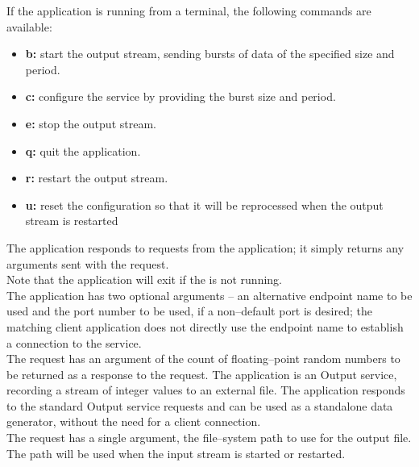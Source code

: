 If the application is running from a terminal, the following commands are available:
\begin{itemize}
\item \textbf{b:} start the output stream, sending bursts of data of the specified size
and period. 
\item \textbf{c:} configure the service by providing the burst size and period. 
\item \textbf{e:} stop the output stream. 
\item \textbf{q:} quit the application. 
\item \textbf{r:} restart the output stream. 
\item \textbf{u:} reset the configuration so that it will be reprocessed when the output
stream is restarted 
\end{itemize}
The  application responds to
 requests from the
 application; it simply returns any arguments
sent with the request.\\

Note that the application will exit if the
 is not running.\\

The application has two optional arguments -- an alternative endpoint name to be used and
the port number to be used, if a non--default port is desired; the matching client
application does not directly use the endpoint name to establish a connection to the
service.\\

The  request has an argument of the
count of floating--point random numbers to be returned as a response to the request.
%
The  application is an Output
service, recording a stream of integer values to an external file.
The application responds to the standard Output service requests and can be used as a
standalone data generator, without the need for a client connection.\\

The  request has a single argument,
the file--system path to use for the output file.
The path will be used when the input stream is started or restarted.\\

